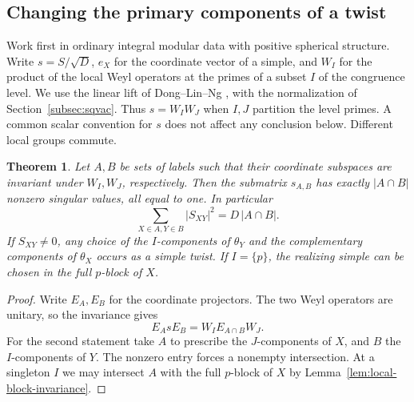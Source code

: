 \documentclass[11pt,a4paper]{article}
\numberwithin{equation}{section}
\newtheorem{theorem}{Theorem}[section]
\theoremstyle{remark}
\begin{document}
\subsection{Changing the primary components of a twist}\label{found:J:4}
Work first in ordinary integral modular data with positive spherical
structure. Write $s=S/\sqrt D$, $e_X$ for the coordinate vector of a
simple, and $W_I$ for the product of the local Weyl operators at the
primes of a subset $I$ of the congruence level. We use the linear lift
of Dong--Lin--Ng \cite[Theorem~II]{DLNCongruence}, with the normalization of Section~\ref{subsec:sqvac}. Thus $s=W_IW_J$ when
$I,J$ partition the level primes. A common scalar convention for $s$
does not affect any conclusion below. Different local groups commute.

\begin{theorem}\label{found:J:4.1}\label{found:J:key:pr:route}
Let $A,B$ be sets of labels such that their coordinate subspaces are
invariant under $W_I,W_J$, respectively. Then the submatrix $s_{A,B}$
has exactly $|A\cap B|$ nonzero singular values, all equal to one.
In particular
\[
          \sum_{X\in A,Y\in B}|S_{XY}|^2=D\,|A\cap B|.
\]
If $S_{XY}\ne0$, any choice of the $I$-components of $\theta_Y$
and the complementary components of $\theta_X$ occurs as a simple
twist. If $I=\{p\}$, the realizing simple can be chosen in the
full $p$-block of $X$.
\end{theorem}
\begin{proof}
Write $E_A,E_B$ for the coordinate projectors. The two Weyl operators
are unitary, so the invariance gives
\[
            E_A s E_B=W_I E_{A\cap B} W_J .
\]
For the second statement take $A$ to prescribe the $J$-components
of $X$, and $B$ the $I$-components of $Y$. The nonzero entry forces
a nonempty intersection. At a singleton $I$ we may intersect $A$
with the full $p$-block of $X$ by Lemma~\ref{lem:local-block-invariance}.
\end{proof}
\end{document}
